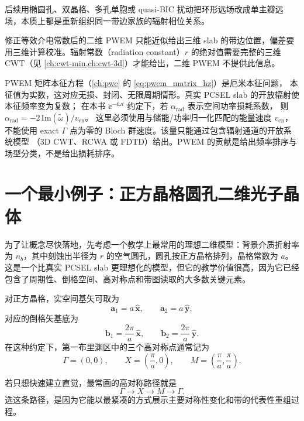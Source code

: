 后续用椭圆孔、双晶格、多孔单胞或 quasi-BIC 扰动把环形远场改成单主瓣远场，本质上都是重新组织同一带边家族的辐射相位关系。

修正等效介电常数后的二维 PWEM 只能近似给出三维 slab 的带边位置，偏差要用三维计算校准。辐射常数（radiation constant）$r$ 的绝对值需要完整的三维 CWT（见 \cref{ch:cwt-min,ch:cwt-3d}）才能给出，二维 PWEM 不提供此信息。

PWEM 矩阵本征方程（\cref{ch:pwe} 的 \cref{eq:pwem_matrix_hz}）是厄米本征问题，
本征值为实数，这对应无损、封闭、无限周期情形。真实 PCSEL slab 的开放辐射使本征频率变为复数；
在本书 $\ee^{-\ii\omega t}$ 约定下，若 $\alpha_{\mathrm{rad}}$ 表示空间功率损耗系数，
则 $\alpha_{\mathrm{rad}}=-2\,\mathrm{Im}(\tilde{\omega})/v_{\mathrm{en}}$。
这里必须使用与储能/功率归一化匹配的能量速度 $v_{\mathrm{en}}$，
不能使用 exact $\Gamma$ 点为零的 Bloch 群速度。该量只能通过包含辐射通道的开放系统模型
（3D CWT、RCWA 或 FDTD）给出。PWEM 的贡献是给出频率排序与场型分类，不是给出损耗排序。

\section{一个最小例子：正方晶格圆孔二维光子晶体}
为了让概念尽快落地，先考虑一个教学上最常用的理想二维模型：背景介质折射率为 $n_b$，其中刻蚀出半径为 $r$ 的空气圆孔，圆孔按正方晶格排列，晶格常数为 $a$。这是一个比真实 PCSEL slab 更理想化的模型，但它的教学价值很高，因为它已经包含了周期性、倒格空间、高对称点和带图读取的大多数关键元素。

对正方晶格，实空间基矢可取为
\begin{equation}
\bm a_1 = a\,\hat{\bm x},
\qquad
\bm a_2 = a\,\hat{\bm y},
\end{equation}
对应的倒格矢基底为
\begin{equation}
\bm b_1 = \frac{2\pi}{a}\,\hat{\bm x},
\qquad
\bm b_2 = \frac{2\pi}{a}\,\hat{\bm y}.
\end{equation}
在这种约定下，第一布里渊区中的三个高对称点通常记为
\begin{equation}
\Gamma=(0,0),
\qquad
X=\left(\frac{\pi}{a},0\right),
\qquad
M=\left(\frac{\pi}{a},\frac{\pi}{a}\right).
\label{eq:square_lattice_points}
\end{equation}

若只想快速建立直觉，最常画的高对称路径就是
\begin{equation}
\Gamma\rightarrow X\rightarrow M\rightarrow \Gamma.
\label{eq:high_symmetry_path_square}
\end{equation}
选这条路径，是因为它能以最紧凑的方式展示主要对称性变化和带的代表性重组过程。

